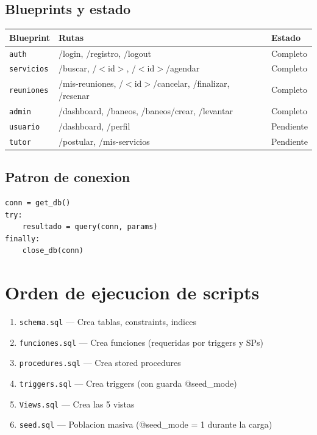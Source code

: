 \documentclass[10pt,a4paper]{article}
\begin{document}
\subsection{Blueprints y estado}
\begin{longtable}{lll}
\toprule
\textbf{Blueprint} & \textbf{Rutas} & \textbf{Estado} \\
\midrule
\texttt{auth} & /login, /registro, /logout & Completo \\
\texttt{servicios} & /buscar, /$<$id$>$, /$<$id$>$/agendar & Completo \\
\texttt{reuniones} & /mis-reuniones, /$<$id$>$/cancelar, /finalizar, /resenar & Completo \\
\texttt{admin} & /dashboard, /baneos, /baneos/crear, /levantar & Completo \\
\texttt{usuario} & /dashboard, /perfil & Pendiente \\
\texttt{tutor} & /postular, /mis-servicios & Pendiente \\
\bottomrule
\end{longtable}

\subsection{Patron de conexion}
\begin{verbatim}
conn = get_db()
try:
    resultado = query(conn, params)
finally:
    close_db(conn)
\end{verbatim}

\section{Orden de ejecucion de scripts}
\begin{enumerate}
    \item \texttt{schema.sql} --- Crea tablas, constraints, indices
    \item \texttt{funciones.sql} --- Crea funciones (requeridas por triggers y SPs)
    \item \texttt{procedures.sql} --- Crea stored procedures
    \item \texttt{triggers.sql} --- Crea triggers (con guarda @seed\_mode)
    \item \texttt{Views.sql} --- Crea las 5 vistas
    \item \texttt{seed.sql} --- Poblacion masiva (@seed\_mode = 1 durante la carga)
\end{enumerate}
\end{document}
